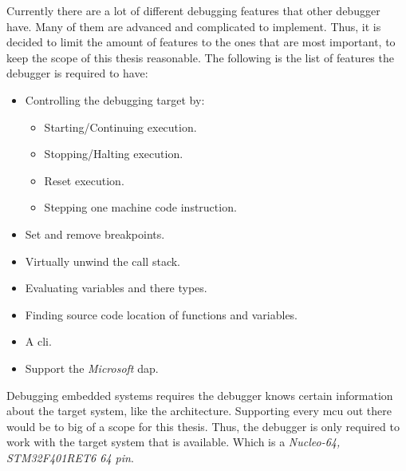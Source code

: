 

Currently there are a lot of different debugging features that other debugger have.
Many of them are advanced and complicated to implement.
Thus, it is decided to limit the amount of features to the ones that are most important, to keep the scope of this thesis reasonable.
The following is the list of features the debugger is required to have:

\begin{itemize} \label{list:debuggerfeatures}
  \item Controlling the debugging target by:
  \begin{itemize}
    \item Starting/Continuing execution.
    \item Stopping/Halting execution.
    \item Reset execution.
    \item Stepping one machine code instruction.
  \end{itemize}
  \item Set and remove breakpoints.
  \item Virtually unwind the call stack.
  \item Evaluating variables and there types.
  \item Finding source code location of functions and variables.
  \item A \acrfull{cli}.
  \item Support the \emph{Microsoft} \acrfull{dap}.
\end{itemize}


Debugging embedded systems requires the debugger knows certain information about the target system, like the architecture.
Supporting every \gls{mcu} out there would be to big of a scope for this thesis.
Thus, the debugger is only required to work with the target system that is available.
Which is a \emph{Nucleo-64, STM32F401RET6 64 pin}.

%


